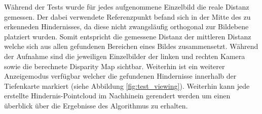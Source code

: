 	\noindent
	Während der Tests wurde für jedes aufgenommene Einzelbild die reale Distanz gemessen. Der dabei verwendete Referenzpunkt befand sich in der Mitte des zu erkenneden Hindernisses, da diese nicht zwangsläufig orthogonal zur Bildebene platziert wurden. Somit entspricht die gemessene Distanz der mittleren Distanz welche sich aus allen gefundenen Bereichen eines Bildes zusammensetzt. Während der Aufnahme sind die jeweiligen Einzelbilder der linken und rechten Kamera sowie die berechnete Disparity Map sichtbar. Weiterhin ist ein weiterer Anzeigemodus verfügbar welcher die gefundenen Hindernisse innerhalb der Tiefenkarte markiert (siehe Abbildung \ref{fig:test_viewing}). Weiterhin kann jede erstellte Hindernis-Pointcloud im Nachhinein gerendert werden um einen überblick über die Ergebnisse des Algorithmus zu erhalten.\\
	
